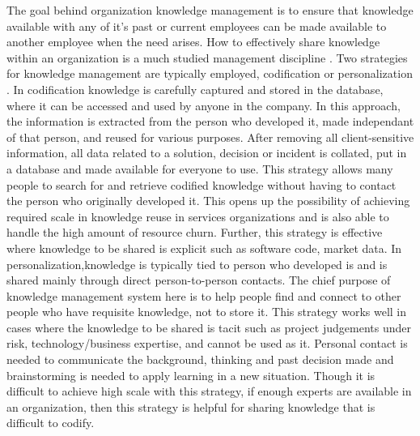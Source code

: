 The goal behind organization knowledge management is to ensure that knowledge available with any of it's past or current employees can be made available to another employee when the need arises. How to effectively share knowledge within an organization is a much studied management discipline \cite{}. Two strategies for knowledge management are typically employed, codification or personalization \cite{}. In codification knowledge is carefully captured and stored in the database, where it can be accessed and used by anyone in the company. In this approach, the information is extracted from the person who developed it, made independant of that person, and reused for various purposes. After removing all client-sensitive information, all data related to a solution, decision or incident is collated, put in a database and made available for everyone to use. This strategy allows many people to search for and retrieve codified knowledge without having to contact the person who originally developed it. This opens up the possibility of achieving required scale in knowledge reuse in services organizations and is also able to handle the high amount of resource churn. Further, this strategy is effective where knowledge to be shared is explicit such as software code, market data. In personalization,knowledge is typically tied to person who developed is and is shared mainly through direct person-to-person contacts. The chief purpose of knowledge management system here is to help people find and connect to other people who have requisite knowledge, not to store it. This strategy works well in cases where the knowledge to be shared is tacit such as project judgements under risk, technology/business expertise, and cannot be used as it. Personal contact is needed to communicate the background, thinking and past decision made and brainstorming is needed to apply learning in a new situation. Though it is difficult to achieve high scale with this strategy, if enough experts are available in an organization, then this strategy is helpful for sharing knowledge that is difficult to codify. 

